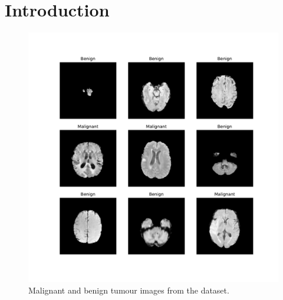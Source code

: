 \chapter{Introduction}
\label{sec:introduction}

\cite{tensorflow}
\begin{figure}[H]
    \centering
    \includegraphics[width=.8\textwidth]{plots/tumor_images.pdf}
    \caption{Malignant and benign tumour images from the dataset.}
    \label{fig:tumorImages}
\end{figure}
